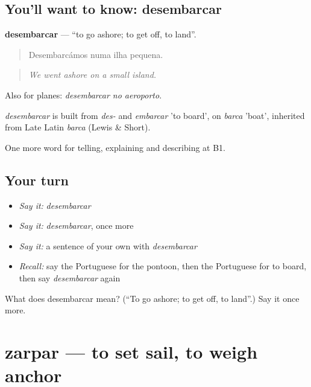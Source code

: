 \subsection*{You'll want to know: desembarcar}
\textbf{desembarcar} — \textquotedblleft{}to go ashore; to get off, to land\textquotedblright{}.

\begin{quote}
Desembarcámos numa ilha pequena.
\end{quote}

\begin{quote}
\emph{We went ashore on a small island.}
\end{quote}

Also for planes: \emph{desembarcar no aeroporto}.

\begin{cousinweb}
\emph{desembarcar} is built from \emph{des-} and \emph{embarcar} 'to board', on \emph{barca} 'boat', inherited from Late Latin \emph{barca} (Lewis \& Short).
\end{cousinweb}

\begin{grammarlens}[title={What you've built}]
One more word for telling, explaining and describing at B1.
\end{grammarlens}

\subsection*{Your turn}
\begin{itemize}
\raggedright
  \item \emph{Say it:} \emph{desembarcar}
  \item \emph{Say it:} \emph{desembarcar}, once more
  \item \emph{Say it:} a sentence of your own with \emph{desembarcar}
  \item \emph{Recall:} say the Portuguese for the pontoon, then the Portuguese for to board, then say \emph{desembarcar} again
\end{itemize}

\begin{tcolorbox}[breakable,colback=teal!4,colframe=teal!35!black,title={Before you move on}]
What does desembarcar mean? (\textquotedblleft{}To go ashore; to get off, to land\textquotedblright{}.) Say it once more.
\end{tcolorbox}
\section[zarpar]{zarpar — to set sail, to weigh anchor}

